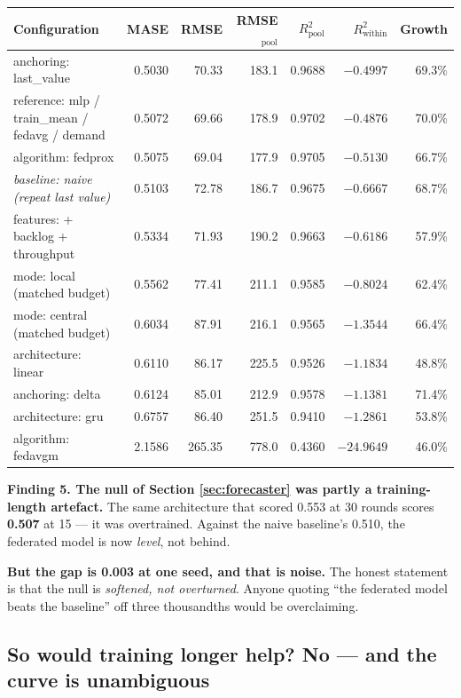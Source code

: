 \documentclass[11pt,a4paper]{article}
\newcommand{\keypoint}[1]{%
  \par\vspace{0.4em}%
  \noindent\colorbox{fed!8}{\parbox{0.98\textwidth}{\vspace{0.2em}#1\vspace{0.2em}}}%
  \par\vspace{0.4em}}
\begin{document}
\begin{center}
\scriptsize
\begin{tabular}{@{}lrrrrrr@{}}
\toprule
\textbf{Configuration} & \textbf{MASE} & \textbf{RMSE} & \textbf{RMSE$_{\text{pool}}$} & \textbf{$R^2_{\text{pool}}$} & \textbf{$R^2_{\text{within}}$} & \textbf{Growth} \\
\midrule
anchoring: last\_value & 0.5030 & 70.33 & 183.1 & 0.9688 & $-0.4997$ & 69.3\% \\
reference: mlp / train\_mean / fedavg / demand & 0.5072 & 69.66 & 178.9 & 0.9702 & $-0.4876$ & 70.0\% \\
algorithm: fedprox & 0.5075 & 69.04 & 177.9 & 0.9705 & $-0.5130$ & 66.7\% \\
\textit{baseline: naive (repeat last value)} & 0.5103 & 72.78 & 186.7 & 0.9675 & $-0.6667$ & 68.7\% \\
features: + backlog + throughput & 0.5334 & 71.93 & 190.2 & 0.9663 & $-0.6186$ & 57.9\% \\
mode: local (matched budget) & 0.5562 & 77.41 & 211.1 & 0.9585 & $-0.8024$ & 62.4\% \\
mode: central (matched budget) & 0.6034 & 87.91 & 216.1 & 0.9565 & $-1.3544$ & 66.4\% \\
architecture: linear & 0.6110 & 86.17 & 225.5 & 0.9526 & $-1.1834$ & 48.8\% \\
anchoring: delta & 0.6124 & 85.01 & 212.9 & 0.9578 & $-1.1381$ & 71.4\% \\
architecture: gru & 0.6757 & 86.40 & 251.5 & 0.9410 & $-1.2861$ & 53.8\% \\
algorithm: fedavgm & 2.1586 & 265.35 & 778.0 & 0.4360 & $-24.9649$ & 46.0\% \\
\bottomrule
\end{tabular}
\end{center}

\keypoint{\textbf{Finding 5. The null of Section \ref{sec:forecaster} was partly a training-length artefact.} The same
architecture that scored 0.553 at 30 rounds scores \textbf{0.507} at 15 --- it was overtrained. Against
the naive baseline's 0.510, the federated model is now \emph{level}, not behind.

\textbf{But the gap is 0.003 at one seed, and that is noise.} The honest statement is that the null is
\emph{softened, not overturned}. Anyone quoting ``the federated model beats the baseline'' off three
thousandths would be overclaiming.}

\subsection{So would training longer help? No --- and the curve is unambiguous}
\end{document}
